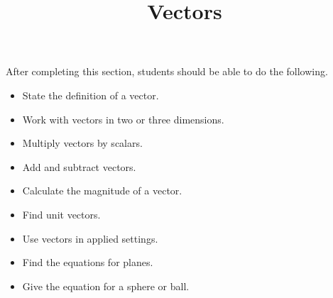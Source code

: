 \documentclass{ximera}
\title{Vectors}
\begin{document}
\begin{abstract}
\end{abstract}

\maketitle

\begin{sectionOutcomes}

After completing this section, students should be able to do the following.

\begin{itemize}
\item State the definition of a vector.
\item Work with vectors in two or three dimensions.
\item Multiply vectors by scalars. 
\item Add and subtract vectors.
\item Calculate the magnitude of a vector.
\item Find unit vectors.
\item Use vectors in applied settings.
\item Find the equations for planes.
\item Give the equation for a sphere or ball.
\end{itemize}

\end{sectionOutcomes}
\end{document}
